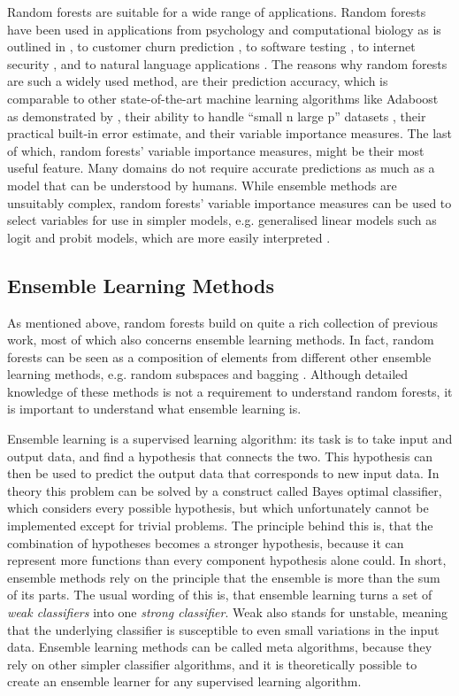 \documentclass[a4paper,man,12pt,apacite,floatsintext,draftfirst]{apa6} %
\begin{document}
Random forests are suitable for a wide range of applications.
Random forests have been used in applications from psychology and
computational biology as is outlined in ,
to customer churn prediction \cite{xie2009customer},
to software testing \cite{guo2004robust}, to internet security
\cite{zhang2005network}, and to natural language applications
\cite{xu2004random, kobylinski2008definition}.
The reasons why random forests are such a widely used method,
are their prediction accuracy, which is comparable to other state-of-the-art
machine learning algorithms like Adaboost as demonstrated
by ,
their ability to handle “small n large p” datasets \cite{strobl2009introduction},
their practical built-in error estimate, and their variable importance measures.
The last of which, random forests' variable importance measures,
might be their most useful feature.
Many domains do not require accurate predictions as much as a model that can
be understood by humans.
While ensemble methods are unsuitably complex,
random forests' variable importance measures can be used to select variables
for use in simpler models, e.g.
generalised linear models such as logit and probit models,
which are more easily interpreted \cite{strobl2009introduction}.

\subsection{Ensemble Learning Methods}
As mentioned above, random forests build on quite a rich collection of
previous work, most of which also concerns ensemble learning methods.
In fact, random forests can be seen as a composition of elements from
different other ensemble learning methods, e.g.
random subspaces \cite{ho1998random} and bagging \cite{breiman1996bagging}.
Although detailed knowledge of these methods is not a requirement to
understand random forests, it is important to understand what
ensemble learning is.

Ensemble learning is a supervised learning algorithm: its task is to take
input and output data, and find a hypothesis that connects
the two.
This hypothesis can then be used to predict the output data that
corresponds to new input data.
In theory this problem can be solved by a construct called
Bayes optimal classifier, which considers every possible hypothesis,
but which unfortunately cannot be implemented except for trivial problems.
The principle behind this is, that the combination of hypotheses becomes
a stronger hypothesis, because it can represent more functions
than every component hypothesis alone could.
In short, ensemble methods rely on the principle that the ensemble is more
than the sum of its parts.
The usual wording of this is, that ensemble learning turns a set of
\emph{weak classifiers} into one \emph{strong classifier}.
Weak also stands for unstable, meaning that the underlying classifier is
susceptible to even small variations in the input data.
Ensemble learning methods can be called meta algorithms,
because they rely on other simpler classifier algorithms,
and it is theoretically possible to create an ensemble learner for any
supervised learning algorithm. \cite{wpEL, Polikar:2009}
\end{document}

